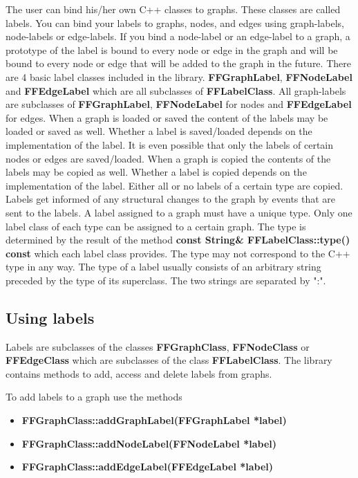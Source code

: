 
The user can bind his/her own C++ classes to graphs. These classes are
called labels. You can bind your labels to graphs, nodes, and
edges using graph-labels, node-labels or edge-labels. If you bind a
node-label or an edge-label to a graph, a prototype of the label is
bound to every node or edge in the graph and will be bound to
every node or edge that will be added to the graph in the future.
There are 4 basic label classes included in the library. {\bf
  FFGraphLabel}, {\bf FFNodeLabel} and {\bf FFEdgeLabel} which
are all subclasses of {\bf FFLabelClass}. All graph-labels are
subclasses of {\bf FFGraphLabel}, {\bf FFNodeLabel} for nodes and
{\bf FFEdgeLabel} for edges. When a graph is loaded or saved the
content of the labels may be loaded or saved as well. Whether a
label is saved/loaded depends on the implementation of the label.
It is even possible that only the labels of certain nodes or
edges are saved/loaded. When a graph is copied the contents of
the labels may be copied as well. Whether a label is copied
depends on the implementation of the label. Either all or no
labels of a certain type are copied.  Labels get informed of any
structural changes to the graph by events that are sent to the
labels. A label assigned to a graph must have a unique type. Only
one label class of each type can be assigned to a certain graph.
The type is determined by the result of the method {\bf const
  String\& FFLabelClass::type() const} which each label class
provides. The type may not correspond to the C++ type in any
way. The type of a label usually consists of an arbitrary string
preceded by the type of its superclass. The two strings are
separated by ":".

\subsection{Using labels}  
\label{using_labels}

Labels are subclasses of the classes {\bf FFGraphClass}, {\bf
FFNodeClass} or {\bf FFEdgeClass} which are subclasses of the class
{\bf FFLabelClass}. The library contains methods to add, access and
delete labels from graphs. 

To add labels to a graph use the methods

\begin{itemize}

\item{\bf  FFGraphClass::addGraphLabel(FFGraphLabel *label)}

\item{\bf FFGraphClass::addNodeLabel(FFNodeLabel *label)}

\item{\bf FFGraphClass::addEdgeLabel(FFEdgeLabel *label)}

\end{itemize}

